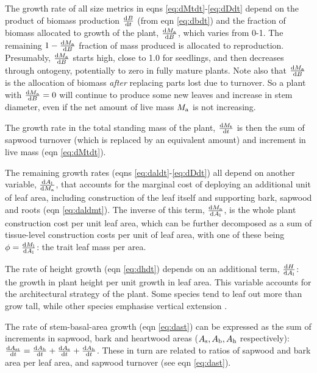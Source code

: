 \documentclass[a4paper,11pt]{article}
\begin{document}
The growth rate of all size metrics in eqns \ref{eq:dMtdt}-\ref{eq:dDdt} depend on the product of biomass production $\frac{{\rm d}B} {{\rm d}t}$ (from eqn \ref{eq:dbdt}) and the fraction of biomass allocated to growth of the plant, $\frac{{\rm d}M_{\rm a}}{{\rm d}B}$, which varies from 0-1. The remaining  $1- \frac{{\rm d}M_{\rm a}}{{\rm d}B}$ fraction of mass produced is allocated to reproduction. Presumably, $\frac{{\rm d}M_{\rm a}}{{\rm d}B}$ starts high, close to 1.0 for seedlings, and then decreases through ontogeny, potentially to zero in fully mature plants. Note also that $\frac{{\rm d}M_{\rm a}}{{\rm d}B}$ is the allocation of biomass \emph{after} replacing parts lost due to turnover. So a plant with $\frac{{\rm d}M_{\rm a}}{{\rm d}B}=0$ will continue to produce some new leaves and increase in stem diameter, even if the net amount of live mass $M_{\rm a}$ is not increasing.

The growth rate in the total standing mass of the plant, $\frac{{\rm d}M_{{\rm t}}}{{\rm d}t}$ is then the sum of sapwood turnover (which is replaced by an equivalent amount) and increment in live mass (eqn \ref{eq:dMtdt}).

The remaining growth rates (eqns \ref{eq:daldt}-\ref{eq:dDdt}) all depend on another variable, $\frac{{\rm d}A_{\rm l}} {{\rm d}M_{\rm a}}$, that accounts for the marginal cost of deploying an additional unit of leaf area, including construction of the leaf itself and supporting  bark, sapwood and roots (eqn \ref{eq:daldmt}). The inverse of this term, $\frac{{\rm d}M_{\rm a} }{{\rm d}A_{\rm l}}$, is the whole plant construction cost per unit leaf area, which can be further decomposed as a sum of tissue-level construction costs per unit of leaf area, with one of these being $\phi = \frac{{\rm d}M_{\rm l} }{{\rm d}A_{\rm l}}$: the trait leaf mass per area.

The rate of height growth (eqn \ref{eq:dhdt}) depends on an additional term, $\frac{{\rm d}H }{{\rm d}A_{\rm l}}$: the growth in plant height per unit growth in leaf area. This variable accounts for the architectural strategy of the plant. Some species tend to leaf out more than grow tall, while other species emphasise vertical extension \citep{Poorter-2006}.

The rate of stem-basal-area growth (eqn \ref{eq:dast}) can be expressed as the sum of increments in sapwood, bark and heartwood areas ($A_{\rm s}, A_{\rm b}, A_{\rm h}$ respectively): $\frac{{\rm d}A_{\rm st}}{{\rm d}t}= \frac{{\rm d}A_{\rm b}}{{\rm d}t} + \frac{{\rm d}A_{\rm s}}{{\rm d}t} + \frac{{\rm d}A_{\rm h}}{{\rm d}t}$. These in turn are related to ratios of sapwood and bark area per leaf area, and sapwood turnover (see eqn \ref{eq:dast}).
\end{document}

